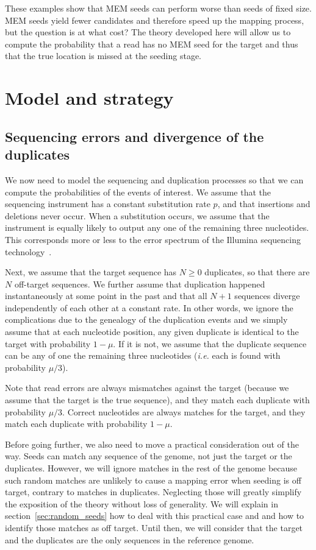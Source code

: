 \documentclass{article}
\begin{document}
These examples show that MEM seeds can perform worse than seeds of fixed
size. MEM seeds yield fewer candidates and therefore speed up the mapping
process, but the question is at what cost? The theory developed here will
allow us to compute the probability that a read has no MEM seed for the
target and thus that the true location is missed at the seeding stage.


\section{Model and strategy}
\label{sec:symbolic}

\subsection{Sequencing errors and divergence of the duplicates}
\label{sec:error}

We now need to model the sequencing and duplication processes so that
we can compute the probabilities of the events of interest. We assume that
the sequencing instrument has a constant substitution rate $p$, and that
insertions and deletions never occur. When a substitution occurs, we
assume that the instrument is equally likely to output any one of the
remaining three nucleotides. This corresponds more or less to the error
spectrum of the Illumina sequencing technology~\cite{pmid21576222}.

Next, we assume that the target sequence has $N \geq 0$ duplicates, so
that there are $N$ off-target sequences. We further assume that
duplication happened instantaneously at some point in the past and that
all $N+1$ sequences diverge independently of each other at a constant
rate. In other words, we ignore the complications due to the genealogy of
the duplication events and we simply assume that at each nucleotide
position, any given duplicate is identical to the target with probability
$1-\mu$. If it is not, we assume that the duplicate sequence can be any of
one the remaining three nucleotides (\textit{i.e.} each is found with
probability $\mu/3$).

Note that read errors are always mismatches against the target (because we
assume that the target is the true sequence), and they match each
duplicate with probability $\mu/3$. Correct nucleotides are always matches
for the target, and they match each duplicate with probability $1-\mu$.

Before going further, we also need to move a practical consideration out
of the way. Seeds can match any sequence of the genome, not just the
target or the duplicates. However, we will ignore matches in the rest of
the genome because such random matches are unlikely to cause a mapping
error when seeding is off target, contrary to matches in duplicates.
Neglecting those will greatly simplify the exposition of the theory
without loss of generality. We will explain in
section~\ref{sec:random_seeds} how to deal with this practical case and
and how to identify those matches as off target. Until then, we will
consider that the target and the duplicates are the only sequences in the
reference genome.
\end{document}
